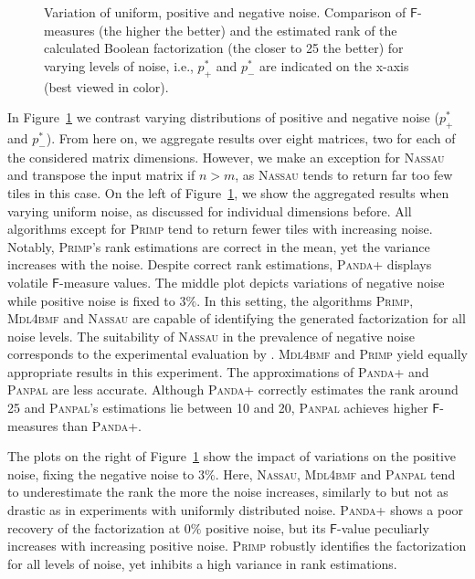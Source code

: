 \begin{figure}
\centering

\caption{Variation of uniform, positive and negative noise. Comparison of $\mathsf{F}$-measures (the higher the better) and the estimated rank of the calculated Boolean factorization (the closer to 25 the better) for varying levels of noise, i.e., $p_+^*$ and $p_-^*$ are indicated on the x-axis (best viewed in color).}
\label{fig:noise}
\end{figure}
In Figure~\ref{fig:noise} we contrast varying distributions of positive and negative noise ($p_+^*$ and $p_-^*$). From here on, we aggregate results over eight matrices, two for each of the considered matrix dimensions. However, we make an exception for \textsc{Nassau} and transpose the input matrix if $n>m$, as \textsc{Nassau} tends to return far too few tiles in this case.
On the left of Figure~\ref{fig:noise}, we show the aggregated results when varying uniform noise, as discussed for individual dimensions before. All algorithms except for \textsc{Primp} tend to return fewer tiles with increasing noise. Notably, \textsc{Primp}'s rank estimations are correct in the mean, yet the variance increases with the noise. Despite correct rank estimations, \textsc{Panda+} displays volatile $\mathsf{F}$-measure values.
The middle plot depicts variations of negative noise while positive noise is fixed to $3\%$. In this setting, the algorithms \textsc{Primp}, \textsc{Mdl4bmf} and \textsc{Nassau} are capable of identifying the generated factorization for all noise levels. The suitability of \textsc{Nassau} in the prevalence of negative noise corresponds to the experimental evaluation by \cite{karaev2015getting}. \textsc{Mdl4bmf} and \textsc{Primp} yield  equally appropriate results in this experiment.  The approximations of \textsc{Panda+} and \textsc{Panpal} are less accurate. Although \textsc{Panda+} correctly estimates the rank around 25 and \textsc{Panpal}'s estimations lie between 10 and 20, \textsc{Panpal} achieves higher $\mathsf{F}$-measures than \textsc{Panda+}.  

The plots on the right of Figure~\ref{fig:noise} show the impact of variations on the positive noise, fixing the negative noise to $3\%$. Here, \textsc{Nassau}, \textsc{Mdl4bmf} and \textsc{Panpal} tend to underestimate the rank the more the noise increases, similarly to but not as drastic as in experiments with uniformly distributed noise. \textsc{Panda+} shows a poor recovery of the factorization at $0\%$  positive noise, but its $\mathsf{F}$-value peculiarly increases with increasing positive noise.  \textsc{Primp} robustly identifies the factorization for all levels of noise, yet inhibits a high variance in rank estimations.
